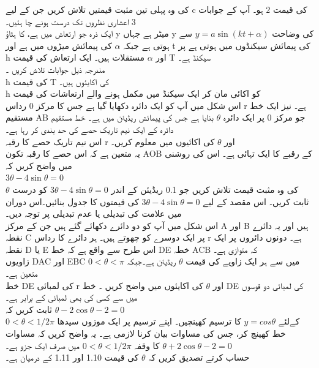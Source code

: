 کی وہ پہلی تین مثبت قیمتیں تلاش کریں جن کے لیے 
c
 کی قیمت 
\(2\)
 ہو۔
آپ کے جوابات 
\(3\)
 اعشاری نظروں تک درست ہونے چا ہئیں۔\\
ایک ذرہ جو ارتعاش میں ہے، کا ہٹاؤ 
y
میٹر ہے جہاں 
y
کی وضاحت 
\(y=a\sin({kt+\alpha})\)
سے ہوتی ہے جبکہ  
\(\alpha\)
کی پیمائش میڑوں میں ہے اور 
t
کی پیمائش سیکنڈوں میں ہوتی ہے پر 
h
اور 
\(\alpha\)
مستقلات ہیں۔ ایک ارتعاش کی قیمت 
T
سیکنڈ ہے۔\\
مندرجہ ذیل جوابات تلاش کریں ۔\\
h
 کی قیمت 
T
کی اکایئوں ہیں۔\\
h
 کو اکائی مان کر ایک سیکنڈ میں
مکمل ہونے والے ارتعاشات کی قیمت\\
اس شکل میں آپ کو ایک دائرہ دکھایا گیا ہے جس کا مرکز
0
رداس
r
ہے۔
نیز ایک خط مستقیم
AB
جو مرکز
0
پر ایک دائرہ
\(\theta\)
بنایا ہے جس کی پیمائش ریڈیئن میں ہے۔ خط مستقیم دائرہ کے ایک نیم تاریک حصے کی حد بندی کر رہا ہے۔\\
اس نیم تاریک حصے کا رقبہ
r
اور
\(\theta\)
کی اکائیوں میں معلوم کریں۔\\
یہ متعین ہے کہ اس حصے کا رقبہ تکون
AOB
کے رقبے کا ایک تہائی ہے۔ اس کی روشنی میں واضح کریں کہ\\
\(3\theta-4\sin{\theta}=0\)\\
\(\theta\)
کی وہ مثبت قیمت تلاش کریں جو
0.1
ریڈیئن کے اندر
\(3\theta-4\sin{\theta}=0\)
کو درست ثابت کریں۔ اس مقصد کے لیے 
\(3\theta-4\sin{\theta}=0\)
کی قیمتوں کا جدول بنائیں۔اس دوران میں علامت کی تبدیلی یا عدم تبدیلی پر توجہ دیں۔ \\
اس شکل میں آپ کو دو دائرے دکھائے گئے ہیں جن کے مرکز
A
اور
B
ہیں اور یہ دائرے نقطہ 
C
پر ایک دوسرے کو چھوتے ہیں۔ ہر دائرے کا رداس
r
ہے۔ دونوں دائروں پر ایک نقطہ
D
یا
E
اس طرح سے واقع ہے کہ خط
DE
خطہ
ACB
کہ متوازی ہے۔\\
زاویوں
DAC
اور
EBC
میں سے ہر ایک زاویے کی قیمت
\(\theta\)
ریڈیئن ہے۔جبکہ
\(0<\theta<\pi\)
متعین ہے۔\\
خط
DE
کی لمبائی
r
اور
\(\theta\)
کی اکایئوں میں واضح کریں ۔
خط
DE
کی لمبائی دو قوسوں میں سے کسی کی بھی لمبائی کے برابر ہے۔\\
ثابت کریں کہ
\(\theta-2\cos{\theta}-2=0\)\\
\(0<\theta<1/2\pi\)
کےلئے
\(y=cos\theta\)
کا ترسیم کھینچیں۔ اپنے ترسیم پر ایک موزوں سیدھا خط کھینچ کر، جس کی مساوات بیان کرنا لازمی ہے۔
یہ واضح کریں کہ مساوات
\(\theta+2\cos{\theta}-2=0\)
کا وقفہ
\(0<\theta<1/2\pi\)
میں صرف ایک جزو ہے۔\\
حساب کرتے تصدیق کریں کہ
\(\theta\)
کی قیمت 
1.10
اور
1.11
کے درمیان ہے۔\\
